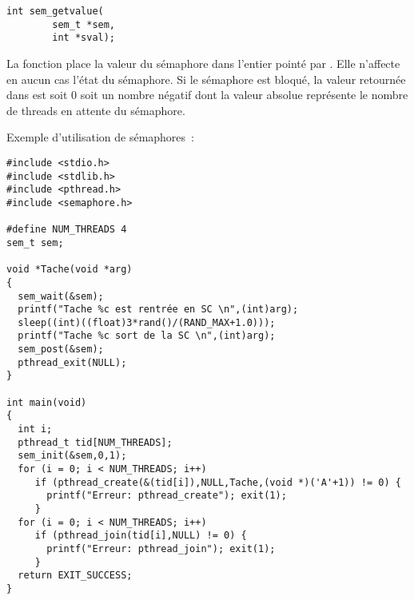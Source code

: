 \begin{lstlisting}
int sem_getvalue(
		sem_t *sem,
		int *sval);
\end{lstlisting}

La fonction  place la valeur du sémaphore dans l'entier pointé par . Elle n'affecte en aucun cas l'état du sémaphore. Si le sémaphore est bloqué, la valeur retournée dans  est soit 0 soit un nombre négatif dont la valeur absolue représente le nombre de threads en attente du sémaphore.

Exemple d'utilisation de sémaphores~:
\begin{lstlisting}[frame=trBL]
#include <stdio.h>
#include <stdlib.h>
#include <pthread.h>
#include <semaphore.h>

#define NUM_THREADS 4
sem_t sem;

void *Tache(void *arg)
{
  sem_wait(&sem);
  printf("Tache %c est rentrée en SC \n",(int)arg);
  sleep((int)((float)3*rand()/(RAND_MAX+1.0)));
  printf("Tache %c sort de la SC \n",(int)arg);
  sem_post(&sem);
  pthread_exit(NULL);
}

int main(void)
{
  int i;
  pthread_t tid[NUM_THREADS];
  sem_init(&sem,0,1);
  for (i = 0; i < NUM_THREADS; i++)
     if (pthread_create(&(tid[i]),NULL,Tache,(void *)('A'+1)) != 0) {
       printf("Erreur: pthread_create"); exit(1);
     }
  for (i = 0; i < NUM_THREADS; i++)
     if (pthread_join(tid[i],NULL) != 0) {
       printf("Erreur: pthread_join"); exit(1);
     }
  return EXIT_SUCCESS;
}
\end{lstlisting}
